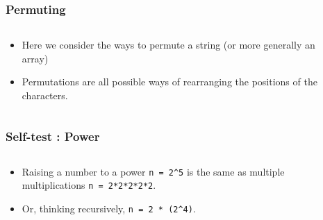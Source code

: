 \begin{frame}[fragile]
\frametitle{Permuting}
\begin{columns}[T]

\begin{column}{0.40\textwidth}
\begin{itemize}[<+->]
\item Here we consider the ways to permute a string (or more generally an array)
\item Permutations are all possible ways of rearranging the positions of the characters.
\end{itemize}
\end{column}

\pause
\begin{column}{0.50\textwidth}

\end{column}

\end{columns}
\end{frame}


\begin{frame}[fragile]
\frametitle{Self-test : Power}
\begin{columns}[T]

\begin{column}{0.45\textwidth}
\begin{itemize}[<+->]
\item Raising a number to a power \verb$n = 2^5$ is the same
as multiple multiplications \verb^n = 2*2*2*2*2^.
\item Or, thinking recursively, \verb$n = 2 * (2^4)$.
\end{itemize}
\end{column}

\pause
\begin{column}{0.45\textwidth}

\end{column}

\end{columns}
\end{frame}

